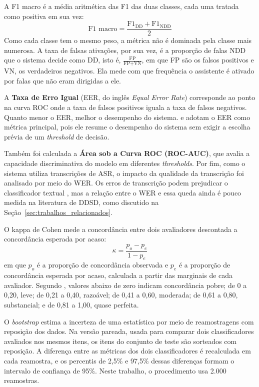 \documentclass[
    12pt,                %
    openright,           %
    oneside,             %
    a4paper,             %
    english,             %
    brazil               %
]{abntex2}
\begin{document}
A F1 macro é a média aritmética das F1 das duas classes, cada uma tratada como positiva em sua vez:
\[
\text{F1 macro} = \frac{\text{F1}_{\text{DD}} + \text{F1}_{\text{NDD}}}{2}
\]
Como cada classe tem o mesmo peso, a métrica não é dominada pela classe mais numerosa. A taxa de falsas ativações, por sua vez, é a proporção de falas NDD que o sistema decide como DD, isto é, $\frac{\text{FP}}{\text{FP} + \text{VN}}$, em que FP são os falsos positivos e VN, os verdadeiros negativos. Ela mede com que frequência o assistente é ativado por falas que não eram dirigidas a ele.

A \textbf{Taxa de Erro Igual} (EER, do inglês \textit{Equal Error Rate}) corresponde ao ponto na curva ROC onde a taxa de falsos positivos iguala a taxa de falsos negativos. Quanto menor o EER, melhor o desempenho do sistema.  e  adotam o EER como métrica principal, pois ele resume o desempenho do sistema sem exigir a escolha prévia de um \textit{threshold} de decisão.

Também foi calculada a \textbf{Área sob a Curva ROC (ROC-AUC)}, que avalia a capacidade discriminativa do modelo em diferentes \textit{thresholds}. Por fim, como o sistema utiliza transcrições de ASR, o impacto da qualidade da transcrição foi analisado por meio do WER. Os erros de transcrição podem prejudicar o classificador textual \cite{Dighe2024}, mas a relação entre o WER e essa queda ainda é pouco medida na literatura de DDSD, como discutido na Seção~\ref{sec:trabalhos_relacionados}.

O kappa de Cohen \cite{Cohen1960} mede a concordância entre dois avaliadores descontada a concordância esperada por acaso:
\[
\kappa = \frac{p_o - p_e}{1 - p_e}
\]
em que $p_o$ é a proporção de concordância observada e $p_e$ é a proporção de concordância esperada por acaso, calculada a partir das marginais de cada avaliador. Segundo , valores abaixo de zero indicam concordância pobre; de 0 a 0,20, leve; de 0,21 a 0,40, razoável; de 0,41 a 0,60, moderada; de 0,61 a 0,80, substancial; e de 0,81 a 1,00, quase perfeita.

O \textit{bootstrap} \cite{Efron1979} estima a incerteza de uma estatística por meio de reamostragens com reposição dos dados. Na versão pareada, usada para comparar dois classificadores avaliados nos mesmos itens, os itens do conjunto de teste são sorteados com reposição. A diferença entre as métricas dos dois classificadores é recalculada em cada reamostra, e os percentis de 2,5\% e 97,5\% dessas diferenças formam o intervalo de confiança de 95\%. Neste trabalho, o procedimento usa 2.000 reamostras.
\end{document}
